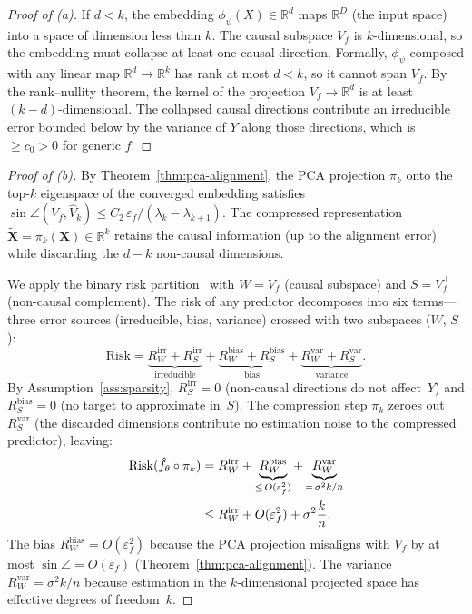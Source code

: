\documentclass[11pt,a4paper]{article}
\theoremstyle{plain}
\theoremstyle{definition}
\theoremstyle{remark}
\newcommand{\R}{\mathbb{R}}
\begin{document}
\begin{proof}[Proof of (a)]
If $d < k$, the embedding $\phi_\psi(X) \in \R^d$ maps $\R^D$ (the input
space) into a space of dimension less than $k$.  The causal subspace $V_f$
is $k$-dimensional, so the embedding must collapse at least one causal
direction.  Formally, $\phi_\psi$ composed with any linear map $\R^d \to \R^k$
has rank at most $d < k$, so it cannot span $V_f$.  By the rank--nullity
theorem, the kernel of the projection $V_f \to \R^d$ is at least
$(k-d)$-dimensional.  The collapsed causal directions contribute an
irreducible error bounded below by the variance of $Y$ along those directions,
which is $\geq c_0 > 0$ for generic $f$.
\end{proof}

\begin{proof}[Proof of (b)]
By Theorem~\ref{thm:pca-alignment}, the PCA projection $\pi_k$ onto the top-$k$
eigenspace of the converged embedding satisfies
$\sin\angle(V_f, \hat{V}_k) \leq C_2\,\varepsilon_f /
(\lambda_k - \lambda_{k+1})$.  The compressed representation
$\tilde{\mathbf{X}} = \pi_k(\mathbf{X}) \in \R^k$ retains the causal
information (up to the alignment error) while discarding the $d-k$ non-causal
dimensions.

We apply the binary risk partition~\citep[Prop.~6]{omega2026} with $W = V_f$
(causal subspace) and $S = V_f^\perp$ (non-causal complement).  The risk of any
predictor decomposes into six terms---three error sources (irreducible, bias,
variance) crossed with two subspaces ($W$, $S$):
\begin{equation}\label{eq:six-way}
  \mathrm{Risk} =
  \underbrace{R^{\mathrm{irr}}_W + R^{\mathrm{irr}}_S}_{\text{irreducible}}
  + \underbrace{R^{\mathrm{bias}}_W + R^{\mathrm{bias}}_S}_{\text{bias}}
  + \underbrace{R^{\mathrm{var}}_W + R^{\mathrm{var}}_S}_{\text{variance}}.
\end{equation}
By Assumption~\ref{ass:sparsity}, $R^{\mathrm{irr}}_S = 0$ (non-causal
directions do not affect~$Y$) and $R^{\mathrm{bias}}_S = 0$ (no target to
approximate in~$S$).  The compression step $\pi_k$ zeroes out
$R^{\mathrm{var}}_S$ (the discarded dimensions contribute no estimation noise
to the compressed predictor), leaving:
\begin{align}
  \mathrm{Risk}(\hat{f}_\theta \circ \pi_k)
  &= R^{\mathrm{irr}}_W
   + \underbrace{R^{\mathrm{bias}}_W}_{\leq\, O(\varepsilon_f^2)}
   + \underbrace{R^{\mathrm{var}}_W}_{=\, \sigma^2 k/n}
  \notag\\
  &\leq R^{\mathrm{irr}}_W + O(\varepsilon_f^2) + \sigma^2\frac{k}{n}.
  \label{eq:compressed-risk}
\end{align}
The bias $R^{\mathrm{bias}}_W = O(\varepsilon_f^2)$ because the PCA projection
misaligns with $V_f$ by at most $\sin\angle = O(\varepsilon_f)$
(Theorem~\ref{thm:pca-alignment}).  The variance $R^{\mathrm{var}}_W =
\sigma^2 k/n$ because estimation in the $k$-dimensional projected space has
effective degrees of freedom~$k$.


\end{proof}
\end{document}
